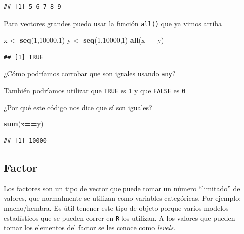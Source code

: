 \documentclass[
]{book}
\newenvironment{Shaded}{\begin{snugshade}}{\end{snugshade}}
\newcommand{\DecValTok}[1]{\textcolor[rgb]{0.00,0.00,0.81}{#1}}
\newcommand{\FunctionTok}[1]{\textcolor[rgb]{0.13,0.29,0.53}{\textbf{#1}}}
\newcommand{\NormalTok}[1]{#1}
\newcommand{\OtherTok}[1]{\textcolor[rgb]{0.56,0.35,0.01}{#1}}
\newcommand{\SpecialCharTok}[1]{\textcolor[rgb]{0.81,0.36,0.00}{\textbf{#1}}}
\begin{document}
\begin{verbatim}
## [1] 5 6 7 8 9
\end{verbatim}

Para vectores grandes puedo usar la función \texttt{all()} que ya vimos arriba

\begin{Shaded}
\begin{Highlighting}[]
\NormalTok{x }\OtherTok{\textless{}{-}} \FunctionTok{seq}\NormalTok{(}\DecValTok{1}\NormalTok{,}\DecValTok{10000}\NormalTok{,}\DecValTok{1}\NormalTok{)}
\NormalTok{y }\OtherTok{\textless{}{-}} \FunctionTok{seq}\NormalTok{(}\DecValTok{1}\NormalTok{,}\DecValTok{10000}\NormalTok{,}\DecValTok{1}\NormalTok{)}
\FunctionTok{all}\NormalTok{(x}\SpecialCharTok{==}\NormalTok{y)}
\end{Highlighting}
\end{Shaded}

\begin{verbatim}
## [1] TRUE
\end{verbatim}

¿Cómo podríamos corrobar que son iguales usando \texttt{any}?

También podríamos utilizar que \texttt{TRUE} es \texttt{1} y que \texttt{FALSE} es \texttt{0}

¿Por qué este código nos dice que sí son iguales?

\begin{Shaded}
\begin{Highlighting}[]
\FunctionTok{sum}\NormalTok{(x}\SpecialCharTok{==}\NormalTok{y)}
\end{Highlighting}
\end{Shaded}

\begin{verbatim}
## [1] 10000
\end{verbatim}

\hypertarget{factor}{%
\subsection{Factor}\label{factor}}

Los factores son un tipo de vector que puede tomar un número ``limitado'' de valores, que normalmente se utilizan como variables categóricas. Por ejemplo: macho/hembra. Es útil tenener este tipo de objeto porque varios modelos estadísticos que se pueden correr en \texttt{R} los utilizan. A los valores que pueden tomar los elementos del factor se les conoce como \emph{levels}.
\end{document}
